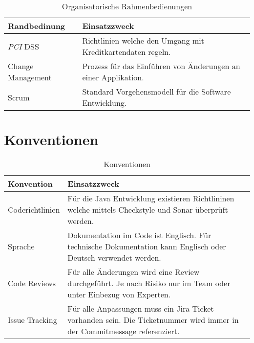 \begin{table}[H]
	\centering
	\caption{Organisatorische Rahmenbedienungen}
	\begin{tabular}{ | p{4cm} | p{11cm} | }
		\toprule
		{\textbf{Randbedinung}} & {\textbf{Einsatzzweck}} \\
		\midrule
		\textit{\gls{PCI}} DSS & Richtlinien welche den Umgang mit Kreditkartendaten regeln. \\ \hline
		Change Management & Prozess für das Einführen von Änderungen an einer Applikation.\\ \hline
		Scrum & Standard Vorgehensmodell für die Software Entwicklung.\\ 
		\bottomrule
	\end{tabular}
\end{table}

\section{Konventionen}

\begin{table}[H]
	\centering
	\caption{Konventionen}
	\begin{tabular}{ | p{4cm} | p{11cm} | }
		\toprule
		{\textbf{Konvention}} & {\textbf{Einsatzzweck}} \\
		\midrule
		Coderichtlinien & Für die Java Entwicklung existieren Richtlininen welche mittels Checkstyle und Sonar überprüft werden. \\ \hline
		Sprache & Dokumentation im Code ist Englisch. Für technische Dokumentation kann Englisch oder Deutsch verwendet werden.\\ \hline
		Code Reviews & Für alle  Änderungen wird eine Review durchgeführt. Je nach Risiko nur im Team oder unter Einbezug von Experten.\\ \hline
		Issue Tracking & Für alle Anpassungen muss ein Jira Ticket vorhanden sein. Die Ticketnummer wird  immer in der Commitmessage referenziert.\\	
		\bottomrule
	\end{tabular}
\end{table}